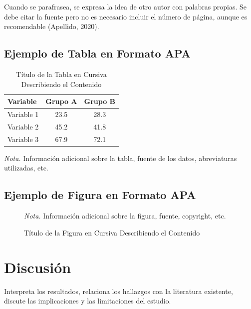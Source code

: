 \documentclass[12pt, letterpaper]{article}
\begin{document}
Cuando se parafrasea, se expresa la idea de otro autor con palabras propias. Se debe citar la fuente pero no es necesario incluir el número de página, aunque es recomendable (Apellido, 2020).

\subsection{Ejemplo de Tabla en Formato APA}

\begin{table}[h]
    \centering
    \caption{Título de la Tabla en Cursiva Describiendo el Contenido}
    \label{tab:ejemplo1}
    \begin{tabular}{@{}lcc@{}}
        \toprule
        Variable & Grupo A & Grupo B \\
        \midrule
        Variable 1 & 23.5 & 28.3 \\
        Variable 2 & 45.2 & 41.8 \\
        Variable 3 & 67.9 & 72.1 \\
        \bottomrule
    \end{tabular}

    \vspace{6pt}
    \small\textit{Nota.} Información adicional sobre la tabla, fuente de los datos, abreviaturas utilizadas, etc.
\end{table}

\subsection{Ejemplo de Figura en Formato APA}

\begin{figure}[h]
    \centering
    \caption{Título de la Figura en Cursiva Describiendo el Contenido}
    \label{fig:ejemplo1}

    \vspace{6pt}
    \small\textit{Nota.} Información adicional sobre la figura, fuente, copyright, etc.
\end{figure}

\section{Discusión}

Interpreta los resultados, relaciona los hallazgos con la literatura existente, discute las implicaciones y las limitaciones del estudio.
\end{document}

